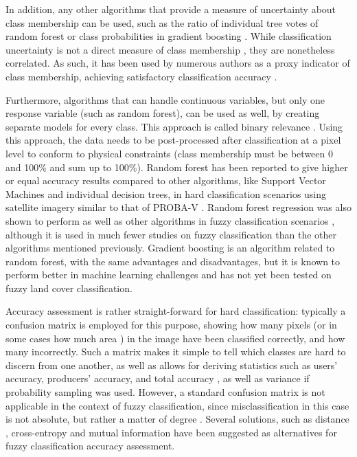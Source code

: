 \documentclass[a4paper,12pt]{scrbook}
\begin{document}
In addition, any other algorithms that provide a measure of uncertainty about class membership can be used, such as the ratio of individual tree votes of random forest \citep{breiman2001random} or class probabilities in gradient boosting \citep{friedman2001gradientboost}. While classification uncertainty is not a direct measure of class membership \citep{sytze2000fuzzyset}, they are nonetheless correlated. As such, it has been used by numerous authors as a proxy indicator of class membership, achieving satisfactory classification accuracy \citep{foody2002accuracy}.

Furthermore, algorithms that can handle continuous variables, but only one response variable (such as random forest), can be used as well, by creating separate models for every class. This approach is called binary relevance \citep{karalas2016br}. Using this approach, the data needs to be post-processed after classification at a pixel level to conform to physical constraints (class membership must be between 0 and 100\% and sum up to 100\%). Random forest has been reported to give higher or equal accuracy results compared to other algorithms, like Support Vector Machines and individual decision trees, in hard classification scenarios using satellite imagery similar to that of PROBA-V \citep{duro2012algorithmcomparison}. Random forest regression was also shown to perform as well as other algorithms in fuzzy classification scenarios \citep{walton2008subpixelrf}, although it is used in much fewer studies on fuzzy classification than the other algorithms mentioned previously. Gradient boosting is an algorithm related to random forest, with the same advantages and disadvantages, but it is known to perform better in machine learning challenges \citep{chen2015higgs} and has not yet been tested on fuzzy land cover classification.

Accuracy assessment is rather straight-forward for hard classification: typically a confusion matrix is employed for this purpose, showing how many pixels (or in some cases how much area \citep{stehman2009sampling}) in the image have been classified correctly, and how many incorrectly. Such a matrix makes it simple to tell which classes are hard to discern from one another, as well as allows for deriving statistics such as users' accuracy, producers' accuracy, and total accuracy \citep{foody1996fuzzyevaluation}, as well as variance if probability sampling was used. However, a standard confusion matrix is not applicable in the context of fuzzy classification, since misclassification in this case is not absolute, but rather a matter of degree \citep{foody2002accuracy}. Several solutions, such as distance \citep{foody1996fuzzyevaluation}, cross-entropy and mutual information \citep{lu2007methods} have been suggested as alternatives for fuzzy classification accuracy assessment.
\end{document}
